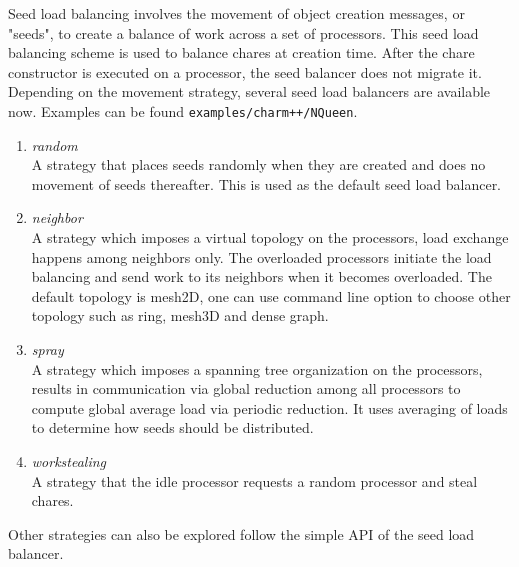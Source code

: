 \label{seedlb}

Seed load balancing involves the movement of object creation messages, or
"seeds", to create a balance of work across a set of processors. 
This seed load balancing scheme is used to balance chares  at creation time.
After the chare constructor is executed on a processor, the seed balancer does not
migrate it.
Depending on the movement strategy, several seed load balancers are available now.
Examples can be found {\tt examples/charm++/NQueen}.
\begin{enumerate}
\item {\em random}\\  
 A strategy that places seeds randomly when they are created and does
no movement of seeds thereafter. This is used as the default seed 
load balancer.
\item {\em neighbor}\\  
 A strategy which imposes a virtual topology on the processors,
 load exchange happens among neighbors only. The overloaded processors
 initiate the load balancing and send work to its neighbors
 when it becomes overloaded. The default topology is mesh2D, one can use
 command line option to choose other topology such as ring, mesh3D and 
 dense graph.
\item {\em spray}\\  
 A strategy which imposes a spanning tree organization on the processors,
 results in communication via global reduction among all processors 
 to compute global average load via periodic reduction. 
 It uses averaging of loads to determine how seeds should be
distributed.
\item  {\em workstealing} \\
 A strategy that the idle processor requests a random processor and steal 
 chares.
\end{enumerate}

Other strategies can also be explored follow the simple API of the 
seed load balancer.
\linebreak

